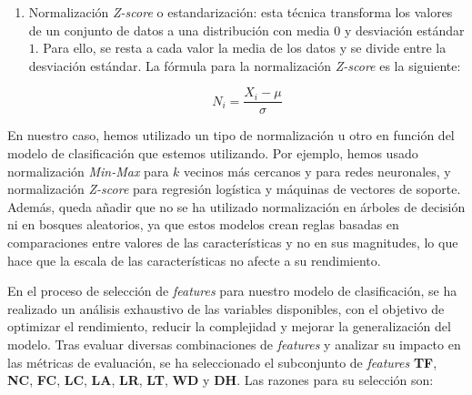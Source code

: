 \begin{itemize}
\begin{enumerate}
        \item Normalización \textit{Z-score} o estandarización: esta técnica transforma los
        valores de un conjunto de datos a una distribución con media $0$ y desviación estándar $1$.
        Para ello, se resta a cada valor la media de los datos y se divide entre la desviación
        estándar. La fórmula para la normalización \textit{Z-score} es la siguiente:

        \begin{equation}
            N_{i} = \frac{X_{i} - \mu}{\sigma}
        \end{equation}
    \end{enumerate}

    En nuestro caso, hemos utilizado un tipo de normalización u otro en función del modelo de
    clasificación que estemos utilizando. Por ejemplo, hemos usado normalización \textit{Min-Max}
    para $k$ vecinos más cercanos y para redes neuronales, y normalización \textit{Z-score} para
    regresión logística y máquinas de vectores de soporte. Además, queda añadir que no se ha
    utilizado normalización en árboles de decisión ni en bosques aleatorios, ya que estos modelos
    crean reglas basadas en comparaciones entre valores de las características y no en sus
    magnitudes, lo que hace que la escala de las características no afecte a su rendimiento.
\end{itemize}

En el proceso de selección de \textit{features} para nuestro modelo de clasificación, se ha
realizado un análisis exhaustivo de las variables disponibles, con el objetivo de optimizar el
rendimiento, reducir la complejidad y mejorar la generalización del modelo. Tras evaluar diversas
combinaciones de \textit{features} y analizar su impacto en las métricas de evaluación, se ha
seleccionado el subconjunto de \textit{features} \textbf{TF}, \textbf{NC}, \textbf{FC},
\textbf{LC}, \textbf{LA}, \textbf{LR}, \textbf{LT}, \textbf{WD} y \textbf{DH}. Las razones para
su selección son:
 
